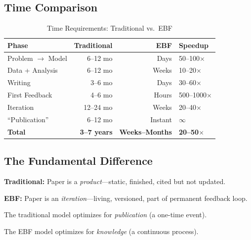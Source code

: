\subsection{Time Comparison}

\begin{table}[htbp]
\centering
\caption{Time Requirements: Traditional vs.\ EBF}
\label{tab:time-comparison}
\renewcommand{\arraystretch}{1.3}
\small
\begin{tabular}{@{}lrrl@{}}
\toprule
\textbf{Phase} & \textbf{Traditional} & \textbf{EBF} & \textbf{Speedup} \\
\midrule
Problem $\to$ Model & 6--12 mo & Days & 50--100$\times$ \\
Data + Analysis & 6--12 mo & Weeks & 10--20$\times$ \\
Writing & 3--6 mo & Days & 30--60$\times$ \\
First Feedback & 4--6 mo & Hours & 500--1000$\times$ \\
Iteration & 12--24 mo & Weeks & 20--40$\times$ \\
``Publication'' & 6--12 mo & Instant & $\infty$ \\
\midrule
\textbf{Total} & \textbf{3--7 years} & \textbf{Weeks--Months} & \textbf{20--50$\times$} \\
\bottomrule
\end{tabular}
\end{table}

\subsection{The Fundamental Difference}

\begin{tcolorbox}[colback=blue!5!white, colframe=blue!75!black,
    title=\textbf{Paper as Product vs.\ Paper as Iteration}]

\textbf{Traditional:} Paper is a \textit{product}---static, finished, cited but not updated.

\textbf{EBF:} Paper is an \textit{iteration}---living, versioned, part of permanent feedback loop.

The traditional model optimizes for \textit{publication} (a one-time event).

The EBF model optimizes for \textit{knowledge} (a continuous process).

\end{tcolorbox}



